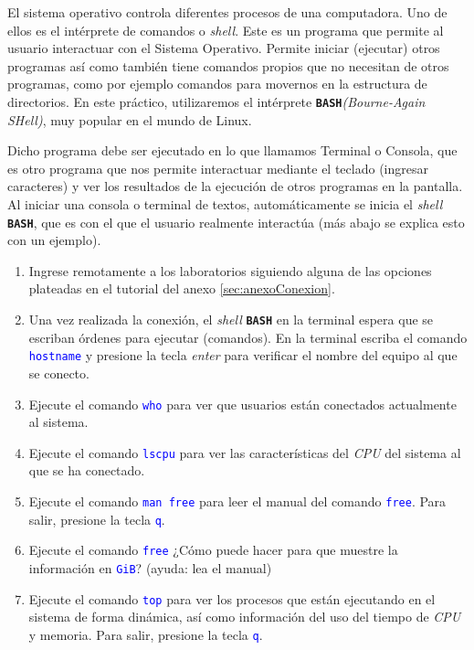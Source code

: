 \documentclass[12pt]{article}
\newcommand{\cw}[1]{\mbox{\texttt{\textcolor{blue}{#1}}}}
\newcommand{\bash}{\textbf{\texttt{BASH}}}
\begin{document}
El sistema operativo controla diferentes procesos de una computadora. Uno de
ellos es el intérprete de comandos o \emph{shell}. Este es un programa que
permite al usuario interactuar con el Sistema Operativo. Permite iniciar
(ejecutar) otros programas así como también tiene comandos propios que no
necesitan de otros programas, como por ejemplo comandos para movernos en la
estructura de directorios. En este práctico, utilizaremos el intérprete
\bash\emph{(Bourne-Again SHell)}, muy popular en el mundo de Linux.

Dicho programa debe ser ejecutado en lo que llamamos Terminal o Consola, que
es otro programa que nos permite interactuar mediante el teclado (ingresar
caracteres) y ver los resultados de la ejecución de otros programas en la
pantalla. Al iniciar una consola o terminal de textos, automáticamente se
inicia el \emph{shell} \bash, que es con el que el usuario realmente
interactúa (más abajo se explica esto con un ejemplo).

\begin{enumerate}

    \item Ingrese remotamente a los laboratorios siguiendo alguna de las
        opciones plateadas en el tutorial del anexo \ref{sec:anexoConexion}.
        
    \item Una vez realizada la conexión, el \emph{shell} \bash{} en la
        terminal espera que se escriban órdenes para ejecutar (comandos). En
        la terminal escriba el comando \cw{hostname} y presione la tecla
        \emph{enter} para verificar el nombre del equipo al que se conecto.

    \item Ejecute el comando \cw{who} para ver que usuarios están conectados
        actualmente al sistema.

    \item Ejecute el comando \cw{lscpu} para ver las características del
        \emph{CPU} del sistema al que se ha conectado.

    \item Ejecute el comando \cw{man free} para leer el manual del comando
        \cw{free}. Para salir, presione la tecla \cw{q}.

    \item Ejecute el comando \cw{free} ¿Cómo puede hacer para que muestre la
        información en \cw{GiB}? (ayuda: lea el manual)

    \item Ejecute el comando \cw{top} para ver los procesos que están
        ejecutando en el sistema de forma dinámica, así como información del
        uso del tiempo de \emph{CPU} y memoria. Para salir, presione la tecla
        \cw{q}.

\end{enumerate}
\end{document}
